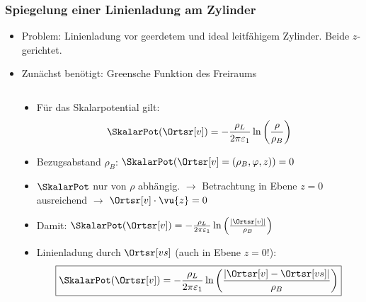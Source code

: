 \begin{frame}
  \frametitle{Spiegelung einer Linienladung am Zylinder}

  \begin{itemize}[<+->]
  \item Problem: Linienladung vor geerdetem und ideal leitfähigem Zylinder. Beide $z$-gerichtet.
    \item Zunächst benötigt: \alert{Greensche Funktion des Freiraums}
    \end{itemize}
\pause
    \begin{columns}
      \begin{column}{.35\textwidth}
\end{column}
\begin{column}{.55\textwidth}
\pause
  \begin{itemize}[<+->]
  \item Für das Skalarpotential gilt:
    \begin{equation*}
      \SkalarPot(\Ortsr[v]) = -\frac{\rho_L}{2\pi\varepsilon_1} \ln\left(\frac{\rho}{\rho_B} \right)
    \end{equation*}
  \item Bezugsabstand $\rho_B$: $\SkalarPot(\Ortsr[v]=(\rho_B,\varphi,z)) = 0$
  \item $\SkalarPot$ nur von $\rho$ abhängig. $\to$ Betrachtung in Ebene $z=0$ ausreichend $\to$ $\Ortsr[v]\cdot \vu{z} = 0$
  \item Damit: $\SkalarPot(\Ortsr[v]) = -\frac{\rho_L}{2\pi\varepsilon_1} \ln\left(\frac{\left|\Ortsr[v]\right|}{\rho_B} \right)$
  \item Linienladung durch $\Ortsr[vs]$ (auch in Ebene $z=0$!):
    \begin{equation*}
      \boxed{\SkalarPot(\Ortsr[v]) = -\frac{\rho_L}{2\pi\varepsilon_1} \ln\left(\frac{\left|\Ortsr[v]-\Ortsr[vs]\right|}{\rho_B} \right)}
      \end{equation*}
\end{itemize}
  \end{column}
\end{columns}
\end{frame}

